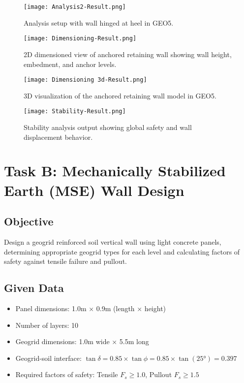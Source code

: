 \documentclass[10pt,a4paper,twocolumn]{article}
\begin{document}
\begin{figure}[htbp]
    \centering
    \texttt{[image: Analysis2-Result.png]}
    \caption{Analysis setup with wall hinged at heel in GEO5.}
    \label{fig:wall_hinged_heel}
\end{figure}
\begin{figure}[htbp]
    \centering
    \texttt{[image: Dimensioning-Result.png]}
    \caption{2D dimensioned view of anchored retaining wall showing wall height, embedment, and anchor levels.}
    \label{fig:wall_dimensioning}
\end{figure}
\begin{figure}[htbp]
    \centering
    \texttt{[image: Dimensioning 3d-Result.png]}
    \caption{3D visualization of the anchored retaining wall model in GEO5.}
    \label{fig:wall_3d_view}
\end{figure}
\begin{figure}[htbp]
    \centering
    \texttt{[image: Stability-Result.png]}
    \caption{Stability analysis output showing global safety and wall displacement behavior.}
    \label{fig:stability_analysis}
\end{figure}


\newpage

\section{Task B: Mechanically Stabilized Earth (MSE) Wall Design}

\subsection{Objective}
Design a geogrid reinforced soil vertical wall using light concrete panels, determining appropriate geogrid types for each level and calculating factors of safety against tensile failure and pullout.

\subsection{Given Data}
\begin{itemize}
\item Panel dimensions: 1.0m × 0.9m (length × height)
\item Number of layers: 10
\item Geogrid dimensions: 1.0m wide × 5.5m long
\item Geogrid-soil interface: $\tan\delta = 0.85 \times \tan\phi = 0.85 \times \tan(25°) = 0.397$
\item Required factors of safety: Tensile $F_s \geq 1.0$, Pullout $F_s \geq 1.5$
\end{itemize}
\end{document}
